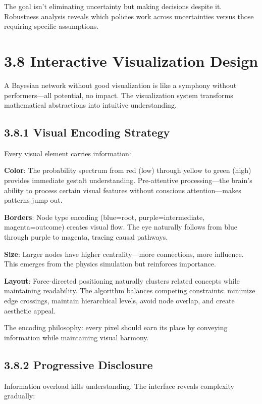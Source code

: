 \documentclass[
  11pt,
  letterpaper,
]{book}
\begin{document}
The goal isn't eliminating uncertainty but making decisions despite it.
Robustness analysis reveals which policies work across uncertainties
versus those requiring specific assumptions.

\section{3.8 Interactive Visualization
Design}\label{sec-visualization-design}

A Bayesian network without good visualization is like a symphony without
performers---all potential, no impact. The visualization system
transforms mathematical abstractions into intuitive understanding.

\subsection{3.8.1 Visual Encoding Strategy}\label{sec-visual-encoding}

Every visual element carries information:

\textbf{Color}: The probability spectrum from red (low) through yellow
to green (high) provides immediate gestalt understanding. Pre-attentive
processing---the brain's ability to process certain visual features
without conscious attention---makes patterns jump out.

\textbf{Borders}: Node type encoding (blue=root, purple=intermediate,
magenta=outcome) creates visual flow. The eye naturally follows from
blue through purple to magenta, tracing causal pathways.

\textbf{Size}: Larger nodes have higher centrality---more connections,
more influence. This emerges from the physics simulation but reinforces
importance.

\textbf{Layout}: Force-directed positioning naturally clusters related
concepts while maintaining readability. The algorithm balances competing
constraints: minimize edge crossings, maintain hierarchical levels,
avoid node overlap, and create aesthetic appeal.

The encoding philosophy: every pixel should earn its place by conveying
information while maintaining visual harmony.

\subsection{3.8.2 Progressive
Disclosure}\label{sec-progressive-disclosure}

Information overload kills understanding. The interface reveals
complexity gradually:
\end{document}
